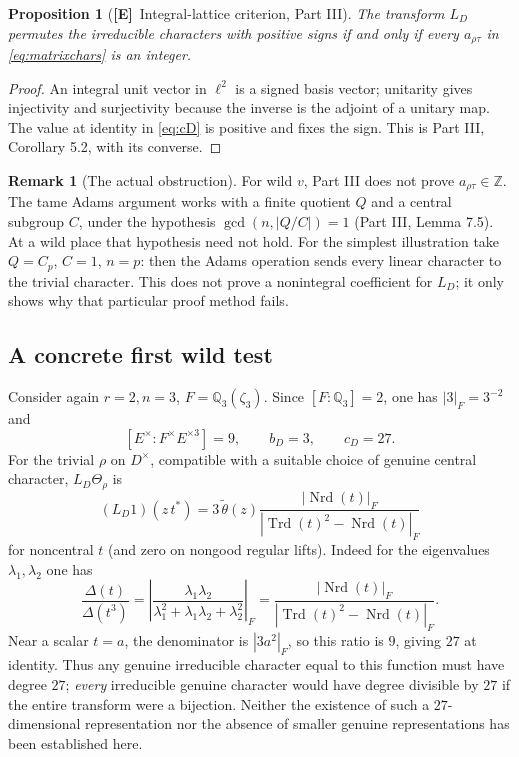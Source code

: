 \documentclass[11pt]{article}
\newcommand{\Z}{\mathbb Z}
\newcommand{\Nrd}{\operatorname{Nrd}}
\newcommand{\Etag}{\textnormal{\textbf{[E]}}}
\theoremstyle{plain}
\newtheorem{proposition}[theorem]{Proposition}
\theoremstyle{definition}
\newtheorem{remark}[theorem]{Remark}
\begin{document}
\begin{proposition}[\Etag\ Integral-lattice criterion, Part III]\label{prop:int}
The transform $L_D$ permutes the irreducible characters with
positive signs if and only if every $a_{\rho\tau}$ in
\eqref{eq:matrixchars} is an integer.
\end{proposition}
\begin{proof}
An integral unit vector in $\ell^2$ is a signed basis vector;
unitarity gives injectivity and surjectivity because the inverse
is the adjoint of a unitary map.  The value at identity in
\eqref{eq:cD} is positive and fixes the sign.
This is Part III, Corollary 5.2, with its converse.
\end{proof}

\begin{remark}[The actual obstruction]
For wild $v$, Part III does not prove
$a_{\rho\tau}\in\Z$.  The tame Adams argument works with a
finite quotient $Q$ and a central subgroup $C$, under the
hypothesis $\gcd(n,|Q/C|)=1$ (Part III, Lemma 7.5).
At a wild place that hypothesis need not hold.  For the
simplest illustration take $Q=C_p$, $C=1$, $n=p$: then the
Adams operation sends every linear character to the trivial
character.  This does not prove a nonintegral coefficient for
$L_D$; it only shows why that particular proof method fails.
\end{remark}

\subsection{A concrete first wild test}\label{subsec:examplewild}
Consider again $r=2,n=3$, $F=\mathbb Q_3(\zeta_3)$.
Since $[F:\mathbb Q_3]=2$, one has
$|3|_F=3^{-2}$ and
\begin{equation}\label{eq:wildconstants}
 [E^\times:F^\times E^{\times3}]=9,\qquad b_D=3,\qquad c_D=27.
\end{equation}
For the trivial $\rho$ on $D^\times$, compatible with a suitable
choice of genuine central character, $L_D\Theta_\rho$ is
\begin{equation}\label{eq:wildexplicit}
 (L_D1)(z\,t^*)
 =3\,\widetilde\theta(z)
 \frac{|\Nrd(t)|_F}
 {|\operatorname{Trd}(t)^2-\Nrd(t)|_F}
\end{equation}
for noncentral $t$ (and zero on nongood regular lifts).
Indeed for the eigenvalues $\lambda_1,\lambda_2$ one has
\[
 \frac{\Delta(t)}{\Delta(t^3)}
 =\left|\frac{\lambda_1\lambda_2}
 {\lambda_1^2+\lambda_1\lambda_2+\lambda_2^2}\right|_F
 =\frac{|\Nrd(t)|_F}{|\operatorname{Trd}(t)^2-\Nrd(t)|_F}.
\]
Near a scalar $t=a$, the denominator is $|3a^2|_F$, so
this ratio is $9$, giving $27$ at identity.
Thus any genuine irreducible character equal to this function
must have degree $27$; \emph{every} irreducible genuine character
would have degree divisible by $27$ if the entire transform were a
bijection.  Neither the existence of such a $27$-dimensional
representation nor the absence of smaller genuine representations
has been established here.
\end{document}
